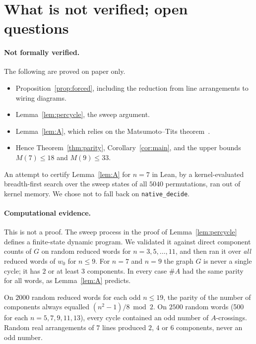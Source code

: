 \section{What is not verified; open questions}\label{sec:limitations}

\paragraph{Not formally verified.}
The following are proved on paper only.
\begin{itemize}
\item Proposition~\ref{prop:forced}, including the reduction from line arrangements to wiring diagrams.
\item Lemma~\ref{lem:percycle}, the sweep argument.
\item Lemma~\ref{lem:A}, which relies on the Matsumoto--Tits theorem~\cite{Matsumoto1964}.
\item Hence Theorem~\ref{thm:parity}, Corollary~\ref{cor:main}, and the upper bounds $M(7)\le18$ and $M(9)\le33$.
\end{itemize}

An attempt to certify Lemma~\ref{lem:A} for $n=7$ in Lean, by a kernel-evaluated breadth-first search over
the sweep states of all $5040$ permutations, ran out of kernel memory. We chose not to fall back on
\texttt{native\_decide}.

\paragraph{Computational evidence.} This is not a proof. The sweep process in the proof of
Lemma~\ref{lem:percycle} defines a finite-state dynamic program. We validated it against direct component
counts of $G$ on random reduced words for $n=3,5,\dots,11$, and then ran it over \emph{all} reduced
words of $w_0$ for $n\le 9$. For $n=7$ and $n=9$ the graph $G$ is never a single cycle; it has $2$ or at
least $3$ components. In every case $\#A$ had the same parity for all words, as Lemma~\ref{lem:A} predicts.

On $2000$ random reduced words for each odd $n\le 19$, the parity of the number of components always
equalled $(n^2-1)/8\bmod 2$. On $2500$ random words (500 for each $n=5,7,9,11,13$), every cycle
contained an odd number of $A$-crossings. Random real arrangements of $7$ lines produced $2$, $4$ or
$6$ components, never an odd number.


